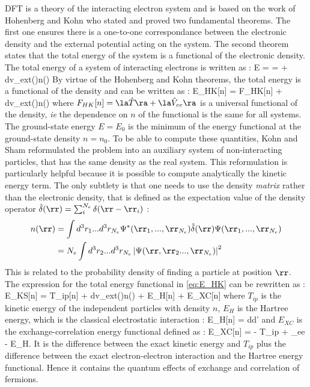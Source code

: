 \gls{DFT} is a theory of the interacting electron system and is based on the work of Hohenberg and Kohn who stated and proved two fundamental theorems. \cite{hohenberg1964} The first one ensures there is a one-to-one correspondance between the electronic density and the external potential acting on the system. The second theorem states that the total energy of the system is a functional of the electronic density.
The total energy of a system of interacting electrons is written as :
\be
	E =  =  + \int d\rr v_{ext}(\rr)n(\rr)
\ee
By virtue of the Hohenberg and Kohn theorems, the total energy is a functional of the density and can be written as :
\be
 	E_{HK}[n] = F_{HK}[n] + \int d\rr v_{ext}(\rr)n(\rr)
	\label{eq:E_HK}
\ee
where $F_{HK}[n] = \la \hat{T} \ra + \la \hat{V}_{ee} \ra$ is a universal functional of the density, \emph{ie} the dependence on $n$ of the functional is the same for all systems. The ground-state energy $E = E_0$ is the minimum of the energy functional at the ground-state density $n=n_0$. To be able to compute these quantities, Kohn and Sham reformulated the problem into an auxiliary system of non-interacting particles, that has the same density as the real system.\cite{kohn1965} This reformulation is particularly helpful because it is possible to compute analytically the kinetic energy term. The only subtlety is that one needs to use the density \emph{matrix} rather than the electronic density, that is defined as the expectation value of the density operator $\hat{\delta}(\rr) = \sum_i^{N_{e}} \delta(\rr - \rr_i)$ :
\begin{align}
\begin{split}
	n(\rr) &= \int d^3r_1 ... d^3r_{N_{e}} \Psi^*(\rr_1,...,\rr_{N_{e}})
	\hat{\delta}(\rr) \Psi(\rr_1,...,\rr_{N_{e}}) \\
	&= N_{e}\int d^3r_2 ... d^3r_{N_{e}} \left| \Psi(\rr,\rr_2...,\rr_{N_{e}})\right|^2
\end{split}
\end{align}
This is related to the probability density of finding a particle at position $\rr$.
The expression for the total energy functional in \ref{eq:E_HK} can be rewritten as :
\be
	E_{KS}[n] = T_{ip}[n] + \int d\rr v_{ext}(\rr)n(\rr) + E_H[n] + E_{XC}[n]
\ee
where $T_{ip}$ is the kinetic energy of the independent particles with density $n$, $E_H$ is the Hartree energy, which is the classical electrostatic interaction :
\be
	E_H[n] = \int d\rr d\rr' 
	\label{eq:E_Hartree}
\ee
and $E_{XC}$ is the exchange-correlation energy functional defined as :
\be
	E_{XC}[n] = \langle {} \rangle - T_{ip} + \langle {}_{ee} \rangle - E_H.
\ee
It is the difference between the exact kinetic energy and $T_{ip}$ plus the difference between the exact electron-electron interaction and the Hartree energy functional. Hence it contains the quantum effects of exchange and correlation of fermions.

